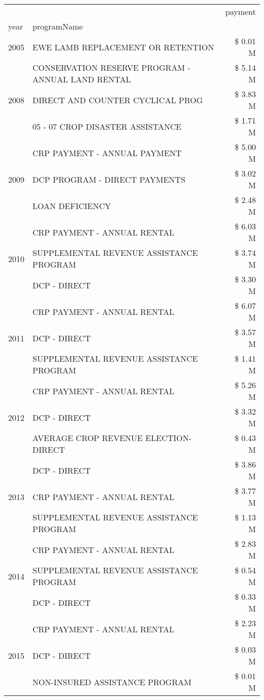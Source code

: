 \begin{tabular}{llr}
\toprule
 &  & payment \\
year & programName &  \\
\midrule
2005 & EWE LAMB REPLACEMENT OR RETENTION & \$ 0.01 M \\
\cline{1-3}
\multirow[t]{3}{*}{2008} & CONSERVATION RESERVE PROGRAM - ANNUAL LAND RENTAL & \$ 5.14 M \\
 & DIRECT AND COUNTER CYCLICAL PROG & \$ 3.83 M \\
 & 05 - 07 CROP DISASTER ASSISTANCE & \$ 1.71 M \\
\cline{1-3}
\multirow[t]{3}{*}{2009} & CRP PAYMENT - ANNUAL PAYMENT & \$ 5.00 M \\
 & DCP PROGRAM - DIRECT PAYMENTS & \$ 3.02 M \\
 & LOAN DEFICIENCY & \$ 2.48 M \\
\cline{1-3}
\multirow[t]{3}{*}{2010} & CRP PAYMENT - ANNUAL RENTAL & \$ 6.03 M \\
 & SUPPLEMENTAL REVENUE ASSISTANCE PROGRAM & \$ 3.74 M \\
 & DCP - DIRECT & \$ 3.30 M \\
\cline{1-3}
\multirow[t]{3}{*}{2011} & CRP PAYMENT - ANNUAL RENTAL & \$ 6.07 M \\
 & DCP - DIRECT & \$ 3.57 M \\
 & SUPPLEMENTAL REVENUE ASSISTANCE PROGRAM & \$ 1.41 M \\
\cline{1-3}
\multirow[t]{3}{*}{2012} & CRP PAYMENT - ANNUAL RENTAL & \$ 5.26 M \\
 & DCP - DIRECT & \$ 3.32 M \\
 & AVERAGE CROP REVENUE ELECTION-DIRECT & \$ 0.43 M \\
\cline{1-3}
\multirow[t]{3}{*}{2013} & DCP - DIRECT & \$ 3.86 M \\
 & CRP PAYMENT - ANNUAL RENTAL & \$ 3.77 M \\
 & SUPPLEMENTAL REVENUE ASSISTANCE PROGRAM & \$ 1.13 M \\
\cline{1-3}
\multirow[t]{3}{*}{2014} & CRP PAYMENT - ANNUAL RENTAL & \$ 2.83 M \\
 & SUPPLEMENTAL REVENUE ASSISTANCE PROGRAM & \$ 0.54 M \\
 & DCP - DIRECT & \$ 0.33 M \\
\cline{1-3}
\multirow[t]{3}{*}{2015} & CRP PAYMENT - ANNUAL RENTAL & \$ 2.23 M \\
 & DCP - DIRECT & \$ 0.03 M \\
 & NON-INSURED ASSISTANCE PROGRAM & \$ 0.01 M \\

\end{tabular}
